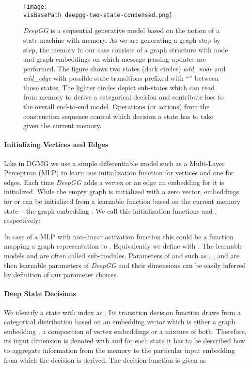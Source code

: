 \documentclass{article}
\newcommand{\visBasePath}[0]{vis/}
\begin{document}
\begin{figure*}
  \begin{minipage}[c]{0.55\linewidth}
    \caption{
		\textit{DeepGG} is a sequential generative model based on the notion of a state machine with memory.
		As we are generating a graph step by step, the memory in our case consists of a graph structure with node and graph embeddings on which message passing updates are performed.
		The figure shows two states (dark circles) \textit{add\_node} and \textit{add\_edge} with possible state transitions prefixed with ``'' between those states.
		The lighter circles depict sub-states which can read from memory to derive a categorical decision and contribute loss to the overall end-to-end model.
		Operations (or actions) from the construction sequence control which decision a state has to take given the current memory.
	}
	\label{fig:deepgg-two-states}
  \end{minipage}\hfill
  \begin{minipage}[c]{0.44\linewidth}
    \texttt{[image: \\visBasePath deepgg-two-state-condensed.png]}
  \end{minipage}
\end{figure*}


\paragraph{Initializing Vertices and Edges} Like in DGMG \cite[4.1]{li2018learning} we use a simple differentiable model such as a Multi-Layer Perceptron (MLP) to learn one initialization function for vertices and one for edges.
Each time \textit{DeepGG} adds a vertex  or an edge  an embedding for it is initialized.
While the empty graph is initialized with a zero vector, embeddings for  or  can be initialized from a learnable function based on the current memory state -- the graph embedding .
We call this initialization functions  and , respectively:

In case of a MLP with non-linear activation function  this could be a function mapping a graph representation  to .
Equivalently we define	 with .
The learnable models  and  are often called sub-modules.
Parameters of  and  such as , ,  and  are then learnable parameters of \textit{DeepGG} and their dimensions can be easily inferred by definition of our parameter choices.


\paragraph{Deep State Decisions} We identify a state with index  as .
Its transition decision function draws from a categorical distribution based on an embedding vector which is either a graph embedding , a composition of vertex embeddings  or a mixture of both.
Therefore, its input dimension is denoted with  and for each state it has to be described how to aggregate information from the memory to the particular input embedding from which the decision is derived.
The decision function  is given as
\end{document}
